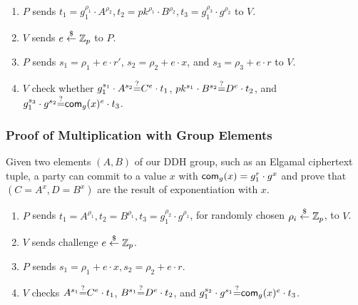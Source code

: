 \begin{enumerate}
  \item $P$ sends $t_1=g_1^{\rho_1}\cdot{}A^{\rho_2},t_2=pk^{\rho_1}\cdot{}B^{\rho_2},t_3=g_1^{\rho_3}\cdot{}g^{\rho_2}$ to $V$.
  \item $V$ sends $e\stackrel{\$}{\leftarrow}\mathbb{Z}_p$ to $P$.
    \item $P$ sends $s_1=\rho_1+e\cdot{}r'$, $s_2=\rho_2+e\cdot{}x$,
      and $s_3=\rho_3+e\cdot{}r$ to $V$.
\item $V$ check whether $g_1^{s_1}\cdot{}A^{s_2}{\stackrel{?}{=}}{}C^e\cdot{}t_1$,
  $pk^{s_1}\cdot{}B^{s_2}{\stackrel{?}{=}}{}D^e\cdot{}t_2$, and
  $g_1^{s_3}\cdot{}g^{s_2}{\stackrel{?}{=}}{}\mathsf{com}_g(x)^e\cdot{}t_3$.
\end{enumerate}


\subsubsection{Proof of Multiplication with Group Elements}
\label{pomult}
Given two elements $(A,B)$ of our DDH group, such as an Elgamal
ciphertext tuple, a party can commit to a value $x$ with $\mathsf{com}_g(x)
=g_1^r\cdot{}g^x$ and prove that $(C=A^x,D=B^x)$ are the result of
exponentiation with $x$.

\begin{enumerate}
      \item $P$ sends $t_1=A^{\rho_1},t_2=B^{\rho_1},
        t_3=g_1^{\rho_2}\cdot{}g^{\rho_1}$, for randomly chosen
        $\rho_i\stackrel{\$}{\leftarrow}\mathbb{Z}_p$, to $V$.

      \item $V$ sends challenge $e\stackrel{\$}{\leftarrow}\mathbb{Z}_p$.

      \item $P$ sends $s_1=\rho_1+e\cdot{}x,s_2=\rho_2+e\cdot{}r$.
        \item $V$ checks $A^{s_1}{\stackrel{?}{=}}{}C^e\cdot{}t_1$,
          $B^{s_1}{\stackrel{?}{=}}{}D^e\cdot{}t_2$, and
          $g_1^{s_2}\cdot{}g^{s_1}{\stackrel{?}{=}}{}\mathsf{com}_g(x)^e\cdot{}t_3$.
          
      \end{enumerate}   

